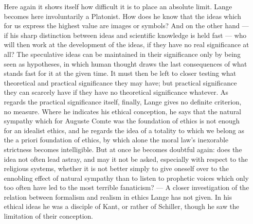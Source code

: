 \documentclass[12pt,a4paper]{book}
\begin{document}
Here again it shows itself how difficult it is to place an absolute limit. Lange
becomes here involuntarily a Platonist. How does he know that the ideas which for
us express the highest value are images or symbols? And on the other hand --- if
his sharp distinction between ideas and scientific knowledge is held fast --- who
will then work at the development of the ideas, if they have no real significance
at all? The speculative ideas can be maintained in their significance only by
being seen as hypotheses, in which human thought draws the last consequences of
what stands fast for it at the given time. It must then be left to closer testing
what theoretical and practical significance they may have; but practical
significance they can scarcely have if they have no theoretical significance
whatever. As regards the practical significance itself, finally, Lange gives no
definite criterion, no measure. Where he indicates his ethical conception, he
says that the natural sympathy which for Auguste Comte was the foundation of
ethics is not enough for an idealist ethics, and he regards the idea of a
totality to which we belong as the a priori foundation of ethics, by which alone
the moral law's inexorable strictness becomes intelligible. But at once he
becomes doubtful again: does the idea not often lead astray, and may it not be
asked, especially with respect to the religious systems, whether it is not better
simply to give oneself over to the ennobling effect of natural sympathy than to
listen to prophetic voices which only too often have led to the most terrible
fanaticism? --- A closer investigation of the relation between formalism and
realism in ethics Lange has not given. In his ethical ideas he was a disciple of
Kant, or rather of Schiller, though he saw the limitation of their conception.
\end{document}

